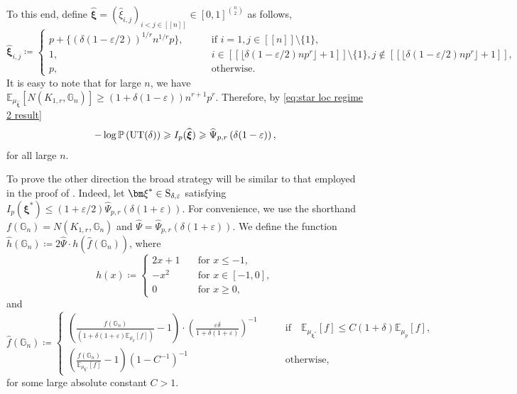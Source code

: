 \documentclass[a4paper,11pt,english,reqno]{amsart}
\numberwithin{equation}{section}
\renewcommand{\leq}{\leqslant}
\renewcommand{\geq}{\geqslant}
\newcommand{\E}{\mathbb{E}}
\newcommand{\UT}{\textup{UT}(\delta)}
\renewcommand{\P}{\mathbb{P}}
\newcommand{\G}{\mathbb{G}}
\newcommand{\tu}[1]{\textup{#1}}
\newcommand{\set}[1]{[\![#1]\!]}
\begin{document}
	To this end, define $\widehat{\boldsymbol{\xi}} = (\widehat \xi_{i,j})_{i < j \in \set{n}} \in [0,1]^{n\choose 2}$ as follows, 
	\begin{equation}\label{eq:hat-xi}
		\widehat{\boldsymbol{\xi}}_{i,j} \coloneqq \begin{cases}
			p+\{\left(\delta(1-\varepsilon/2)\right)^{1/r}n^{1/r}p\}, \qquad &\text{if $i=1,j\in \set{n}\setminus\{1\}$},\\
			1, \qquad  &  i \in \set{\lfloor \delta (1-\varepsilon/2) n p^r \rfloor +1}\setminus \{1\}, j \notin \set{\lfloor \delta(1-\varepsilon/2) n p^r \rfloor +1}, \\
			p, &\text{otherwise}.
		\end{cases}
	\end{equation}
	It is easy to note that for large $n$, we have $\E_{\mu_{\widehat{\boldsymbol{\xi}}}}\left[N(K_{1,r}, \G_{n})\right] \geq \left(1+\delta(1-\varepsilon)\right)n^{r+1}p^{r}$.
	Therefore, by \eqref{eq:star loc regime 2 result}
	\begin{equation*}
		-\log \P\left(\UT\right) \geq I_{p}(\widehat{\boldsymbol{\xi}}) \geq \widehat\Psi_{p,r}\left(\delta(1-\varepsilon)\right),
	\end{equation*}
for all large $n$.

	To prove the other direction the broad strategy will be similar to that employed in the proof of \cite[Theorem~1.8]{AB}. Indeed, let ${\bm \xi}^{*}\in \tu{S}_{\delta,\varepsilon}$ satisfying $I_{p}({\bm \xi}^{*})\leq (1+\varepsilon/2)\widehat{\Psi}_{p,r}(\delta(1+\varepsilon))$. For convenience, we use the shorthand $f(\G_n) = N(K_{1,r},\G_n)$ and $\widehat{\Psi} = \widehat{\Psi}_{p,r}(\delta(1+\varepsilon))$. We define the function $\widehat{h}(\G_n)\coloneqq 2\widehat{\Psi}\cdot h(\widehat{f}(\G_n))$, where
	\[h(x) \coloneqq \begin{cases}
		2x+1 \quad &\text{for }x\leq -1,\\
		-x^2 &\text{for }x\in [-1,0],\\
		0 &\text{for }x\geq 0,
	\end{cases}\]
and 
\[\widehat{f}(\G_n)\coloneqq \begin{cases}
	\left(\frac{f(\G_n)}{(1+\delta(1+\varepsilon)\E_{\mu_p}[f])}-1\right)\cdot \left(\frac{\varepsilon\delta}{1+\delta(1+\varepsilon)}\right)^{-1}\qquad &\text{if}\quad \E_{\mu_{\bm \xi^{*}}}[f]\leq C(1+\delta)\E_{\mu_p}[f],\\
	\left(\frac{f(\G_n)}{\E_{\mu_{\bm \xi^{*}}}[f]}-1\right)(1-C^{-1})^{-1}&\text{otherwise},
\end{cases}\]
for some large absolute constant $C>1$.
\end{document}

